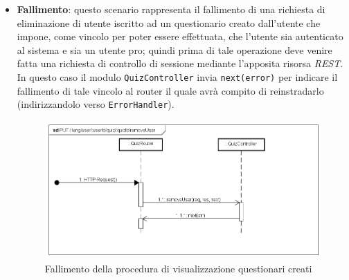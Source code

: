 \begin{itemize}
\item \textbf{Fallimento}: questo scenario rappresenta il fallimento di una richiesta di eliminazione di utente iscritto ad un questionario creato dall'utente che impone, come vincolo per poter essere effettuata, che l'utente sia autenticato al sistema e sia un utente pro; quindi prima di tale operazione deve venire fatta una richiesta di controllo di sessione mediante l'apposita risorsa \textit{REST}. In questo caso il modulo \texttt{QuizController} invia \texttt{next(error)} per indicare il fallimento di tale vincolo al router il quale avrà compito di reinstradarlo (indirizzandolo verso \texttt{ErrorHandler}).
\label{Fallimento della procedura di rimozione di un utente iscritto ad un questionario creato}
\begin{figure}[ht]
	\centering
	\includegraphics[scale=0.50]{UML/DiagrammiDiSequenza/Back-end/PUT_LangUserUserIdQuizQuizIdRemoveUserFailure.png}
	\caption{Fallimento della procedura di visualizzazione questionari creati}
\end{figure}
\FloatBarrier
\end{itemize}


